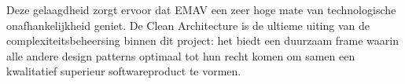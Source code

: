 Deze gelaagdheid zorgt ervoor dat EMAV een zeer hoge mate van technologische onafhankelijkheid geniet. De Clean Architecture is de ultieme uiting van de complexiteitsbeheersing binnen dit project: het biedt een duurzaam frame waarin alle andere design patterns optimaal tot hun recht komen om samen een kwalitatief superieur softwareproduct te vormen.
